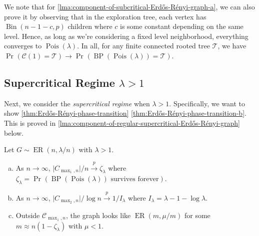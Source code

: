\begin{note}
	We note that for \autoref{lma:component-of-subcritical-Erdős-Rényi-graph-a}, we can also prove it by observing that in the exploration tree, each vertex has \(\operatorname{Bin}(n-1-c, p) \) children where \(c\) is some constant depending on the same level. Hence, as long as we're considering a fixed level neighborhood, everything converges to \(\operatorname{Pois}(\lambda ) \). In all, for any finite connected rooted tree \(\mathcal{T} \), we have \(\Pr_{}(\mathcal{C} (1) = \mathcal{T} )  \to \Pr_{}(\operatorname{BP}(\operatorname{Pois}(\lambda ) ) = \mathcal{T} )\).
\end{note}

\subsection{Supercritical Regime \(\lambda > 1\)}
Next, we consider the \emph{supercritical regime} when \(\lambda > 1\). Specifically, we want to show \autoref{thm:Erdős-Rényi-phase-transition} \autoref{thm:Erdős-Rényi-phase-transition-b}. This is proved in \autoref{lma:component-of-regular-supercritical-Erdős-Rényi-graph} below.

\begin{lemma}\label{lma:component-of-regular-supercritical-Erdős-Rényi-graph}
	Let \(G \sim \operatorname{ER}(n, \lambda / n) \) with \(\lambda > 1\).
	\begin{enumerate}[(a)]
		\item\label{lma:component-of-regular-supercritical-Erdős-Rényi-graph-a} As \(n\to \infty \), \(\lvert C_{\max _1, n} \rvert / n \overset{p}{\to} \zeta _\lambda\) where \(\zeta _\lambda = \Pr_{}(\operatorname{BP}(\operatorname{Pois}(\lambda ) ) \text{ survives forever} ) \).
		\item\label{lma:component-of-regular-supercritical-Erdős-Rényi-graph-b} As \(n\to \infty \), \(\lvert C_{\max _2, n} \rvert / \log n \overset{p}{\to} 1 / I_\lambda \) where \(I_\lambda = \lambda - 1 - \log \lambda \).
		\item\label{lma:component-of-regular-supercritical-Erdős-Rényi-graph-c} Outside \(\mathcal{C} _{\max _1, n}\), the graph looks like \(\operatorname{ER}(m, \mu / m) \) for some \(m \approx n (1 - \zeta _\lambda )\) with \(\mu < 1\).
	\end{enumerate}
\end{lemma}

